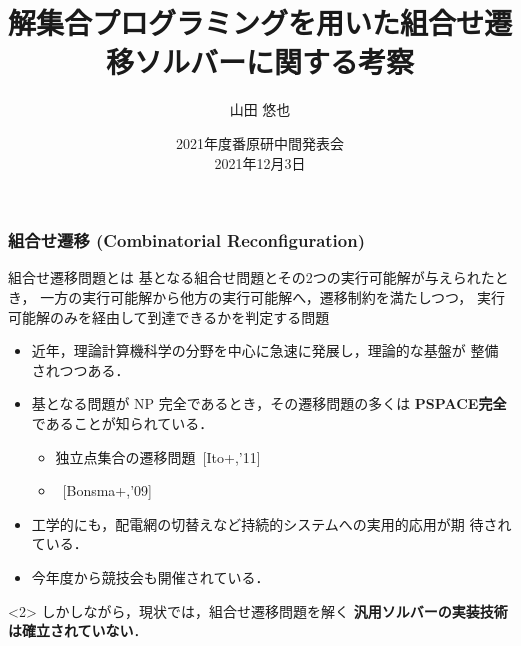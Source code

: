 \documentclass[dvipdfmx,11pt]{beamer}
\title{解集合プログラミングを用いた組合せ遷移ソルバーに関する考察}
\author{山田 悠也}
\date{2021年度番原研中間発表会\\2021年12月3日}
\institute{番原研究室}
\begin{document}
\maketitle
\begin{frame}
  \frametitle{組合せ遷移 (Combinatorial Reconfiguration)}
  \begin{alertblock}{組合せ遷移問題とは}
    基となる組合せ問題とその2つの実行可能解が与えられたとき，
    一方の実行可能解から他方の実行可能解へ，遷移制約を満たしつつ，
    実行可能解のみを経由して到達できるかを判定する問題
  \end{alertblock}

  \begin{itemize}
  \item 近年，理論計算機科学の分野を中心に急速に発展し，理論的な基盤が
    整備されつつある\footnotemark[1]．
  \item 基となる問題が NP 完全であるとき，その遷移問題の多くは
    \alert{\bf PSPACE完全}であることが知られている．
    \begin{itemize}
    \item 独立点集合の遷移問題~[Ito+,'11]
    \item {}~[Bonsma+,'09]
    \end{itemize}
  \item 工学的にも，配電網の切替えなど持続的システムへの実用的応用が期
    待されている．
  \item 今年度から競技会も開催されている．
  \end{itemize}

  \begin{alertblock}<2>{}\centering
    しかしながら，現状では，組合せ遷移問題を解く
    \alert{\bf 汎用ソルバーの実装技術は確立されていない}．
  \end{alertblock}

\end{frame}
\end{document}
